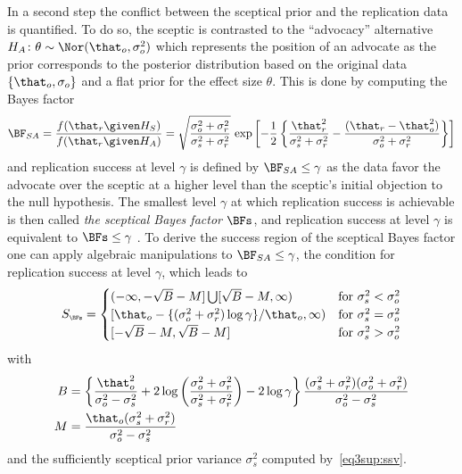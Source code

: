 \begin{subappendices}
In a second step the conflict between the sceptical prior and the replication
data is quantified. To do so, the sceptic is contrasted to the ``advocacy''
alternative $H_{A} \colon \theta \sim \Nor(\that_{o}, \sigma^{2}_{o})$ which
represents the position of an advocate as the prior corresponds to the posterior
distribution based on the original data $\{\that_{o}, \sigma_{o}\}$ and a flat
prior for the effect size $\theta$. This is done by computing the Bayes factor
\begin{align*}
  \BF_{SA}
  = \frac{f(\that_{r} \given H_{S})}{f(\that_{r} \given H_{A})}
  = \sqrt{\frac{\sigma^{2}_{o} + \sigma^{2}_{r}}{\sigma^{2}_{s} + \sigma^{2}_{r}}}
  \, \exp\left[-\frac{1}{2}\left\{\frac{\that_{r}^{2}}{\sigma^{2}_{s} +
  \sigma^{2}_{r}} - \frac{(\that_{r} - \that_{o}^{2})}{\sigma^{2}_{o} +
  \sigma^{2}_{r}}\right\}\right]
\end{align*}
and replication success at level $\gamma$ is defined by $\BF_{SA} \leq \gamma$
as the data favor the advocate over the sceptic at a higher level than the
sceptic's initial objection to the null hypothesis. The smallest level $\gamma$
at which replication success is achievable is then called \emph{the sceptical
  Bayes factor} $\BFs$, and replication success at level $\gamma$ is equivalent
to $\BFs \leq \gamma$ \citep[see][for details on how to compute
$\BFs$]{Pawel2022b}. To derive the success region of the sceptical Bayes factor
one can apply algebraic manipulations to $\BF_{SA} \leq \gamma$, the condition
for replication success at level $\gamma$, which leads to
\begin{align}
  \label{eq3sup:BFssuccess}
  S_{\scriptscriptstyle \BFs}
  = \begin{cases}
    (-\infty, -\sqrt{B} - M] \bigcup [\sqrt{B} - M, \infty) & \text{for} ~ \sigma^{2}_{s} < \sigma^{2}_{o} \\
    [\that_{o} -\{(\sigma^{2}_{o} + \sigma^{2}_{r})\log\gamma\}/\that_{o}, \infty)
    & \text{for} ~ \sigma^{2}_{s} = \sigma^{2}_{o}  \\
    [-\sqrt{B} - M, \sqrt{B} - M] & \text{for} ~ \sigma^{2}_{s} > \sigma^{2}_{o}
    \end{cases}
\end{align}
with
\begin{align*}
  B &= \left\{\frac{\that_{o}^{2}}{\sigma^{2}_{o} - \sigma^{2}_{s}} +
      2\log\left(\frac{\sigma^{2}_{o} + \sigma^{2}_{r}}{\sigma^{2}_{s} + \sigma^{2}_{r}}\right)
      - 2\log \gamma \right\}
      \frac{(\sigma^{2}_{s} + \sigma^{2}_{r})(\sigma^{2}_{o} + \sigma^{2}_{r})}{\sigma^{2}_{o}
       - \sigma^{2}_{s}} \\
  M &= \frac{\that_{o} (\sigma^{2}_{s} + \sigma^{2}_{r})}{\sigma^{2}_{o} - \sigma^{2}_{s}}
\end{align*}
and the sufficiently sceptical prior variance $\sigma^{2}_{s}$ computed
by~\eqref{eq3sup:ssv}.


\end{subappendices}
